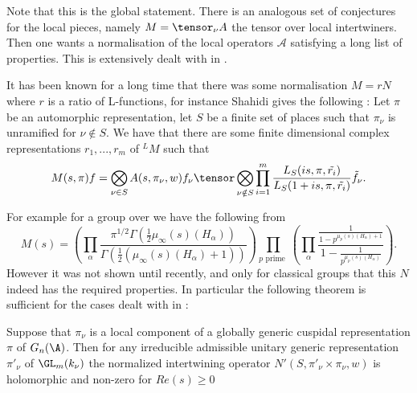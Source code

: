     Note that this is the global statement. There is an analogous set of conjectures for the local pieces, namely \(M = \tensor_\nu A\) the tensor over local intertwiners. Then one wants a normalisation of the local operators \(\mathscr{A}\) satisfying a long list of properties. This is extensively dealt with in \cite{shahidiProofLanglandsConjecture1990}.


    It has been known for a long time that there was some normalisation \(M = rN\) where \(r\) is a ratio of L-functions, for instance Shahidi gives the following \cite{shahidiRamanujanConjectureFiniteness1988}: Let \(\pi\) be an automorphic representation, let \(S\) be a finite set of places such that \(\pi_\nu\) is unramified for \(\nu\notin S\). We have that there are some finite dimensional complex representations \(r_1, ..., r_m\) of \(^LM\) such that 
     \[M(s, \pi)f = \bigotimes_{\nu\in S}A(s, \pi_\nu, w)f_\nu \tensor \bigotimes_{\nu\notin S} \prod_{i=1}^{m}\frac{L_S(is, \pi, \tilde{r_i})}{L_S(1+is, \pi, \tilde{r_i})} \tilde{f}_\nu.\]

    For example for a group over \Q we have the following from \cite{langlandsEulerProductsa} 
    \[M(s) = \left( \prod_\alpha\frac{\pi^{1/2}\Gamma(\frac{1}{2}\mu_\infty(s)(H_\alpha))}{\Gamma(\frac{1}{2}(\mu_\infty(s)(H_\alpha) + 1))} \right)\prod_{p \text{ prime }} \left( \prod_\alpha \frac{\frac{1}{1 - p^{\mu_p(s)(H_\alpha) + 1}}}{1 - \frac{1}{p^{\mu_p(s)(H_\alpha) }}}\right).\]
     However it was not shown until recently, and only for classical groups that this \(N\) indeed has the required properties. In particular the following theorem is sufficient for the cases dealt with in \cite{jiangPolesCertainResidual2013}:
     \begin{Theorem}
        Suppose that \(\pi_\nu\) is a local component of a globally generic cuspidal representation \(\pi\) of \(G_n(\A)\). Then for any irreducible admissible unitary generic representation \(\pi'_\nu\) of \(\GL_m(k_\nu)\) the normalized intertwining operator \(N'(S, \pi'_\nu\times \pi_\nu, w)\) is holomorphic and non-zero for \(Re(s)\geq 0\)
     \end{Theorem}







     

